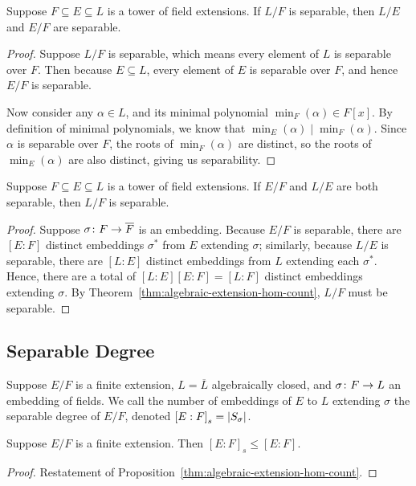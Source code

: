 \begin{proposition}\label{prop:intermediate-field-separable}
    Suppose \(F \subseteq E \subseteq L\) is a tower of field extensions.
    If \(L/F\) is separable, then \(L/E\) and \(E/F\) are separable.
\end{proposition}
\begin{proof}
    Suppose \(L/F\) is separable, which means every element of \(L\) is separable over \(F\).
    Then because \(E \subseteq L\), every element of \(E\) is separable over \(F\),
    and hence \(E/F\) is separable.

    Now consider any \(\alpha \in L\), and its minimal polynomial \(\min_F(\alpha) \in F[x]\).
    By definition of minimal polynomials, we know that \(\min_E(\alpha) \mid \min_F(\alpha)\).
    Since \(\alpha\) is separable over \(F\), the roots of \(\min_F(\alpha)\) are distinct,
    so the roots of \(\min_E(\alpha)\) are also distinct, giving us separability.
\end{proof}
\begin{theorem}\label{thm:separable-transitive}
    Suppose \(F \subseteq E \subseteq L\) is a tower of field extensions.
    If \(E/F\) and \(L/E\) are both separable,
    then \(L/F\) is separable.
\end{theorem}
\begin{proof}
    Suppose \(\sigma\colon F\to\overline{F}\) is an embedding.
    Because \(E/F\) is separable, there are \([E:F]\) distinct embeddings \(\sigma^\ast\)
    from \(E\) extending \(\sigma\);
    similarly, because \(L/E\) is separable, there are \([L:E]\) distinct embeddings from \(L\)
    extending each \(\sigma^\ast\).
    Hence, there are a total of \([L:E][E:F] = [L:F]\) distinct embeddings extending \(\sigma\).
    By Theorem~\ref{thm:algebraic-extension-hom-count},
    \(L/F\) must be separable.
\end{proof}

\subsection*{Separable Degree}

\begin{definition}
    Suppose \(E/F\) is a finite extension,
    \(L = \overline{L}\) algebraically closed,
    and \(\sigma\colon F\to L\) an embedding of fields.
    We call the number of embeddings of \(E\) to \(L\) extending \(\sigma\)
    the separable degree of \(E/F\),
    denoted \({[E:F]}_s = \abs{S_\sigma}\).
\end{definition}
\begin{corollary}
    Suppose \(E/F\) is a finite extension.
    Then \({[E:F]}_s \leq [E:F]\).
\end{corollary}
\begin{proof}
    Restatement of Proposition~\ref{thm:algebraic-extension-hom-count}.
\end{proof}

